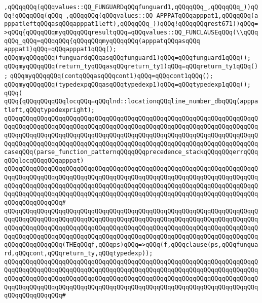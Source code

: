 \verb|,qQQqqQQq(qQQqvalues::QQ_FUNGUARDqQQqfunguard1,qQQqqQQq_,qQQqqQQq_))qQQq!qQQqqQQq(qQQq_,qQQqqQQq(qQQqvalues::QQ_APPPATqQQqapppat1,qQQqqQQq(apppatleftqQQqasqQQqapppat1left),qQQqqQQq_))qQQq!qQQqqQQqrest671))qQQq=>qQQq{qQQqqQQqmyqQQqqQQqresultqQQq=qQQqvalues::QQ_FUNCLAUSEqQQq(\\qQQqqQQq_qQQq=qQQqqQQq{qQQqqQQqmyqQQqqQQq(apppatqQQqasqQQq|\newline
\verb|apppat1)qQQq=qQQqapppat1qQQq();|\newline
\verb|qQQqmyqQQqqQQq(funguardqQQqasqQQqfunguard1)qQQq=qQQqfunguard1qQQq();|\newline
\verb|qQQqmyqQQqqQQq(return_tyqQQqasqQQqreturn_ty1)qQQq=qQQqreturn_ty1qQQq();|\newline
\verb|qQQqmyqQQqqQQq(contqQQqasqQQqcont1)qQQq=qQQqcont1qQQq();|\newline
\verb|qQQqmyqQQqqQQq(typedexpqQQqasqQQqtypedexp1)qQQq=qQQqtypedexp1qQQq();|\newline
\verb|qQQq(|\newline
\verb|qQQq{qQQqqQQqqQQqlocqQQq=qQQqlnd::locationqQQqline_number_dbqQQq(apppatleft,qQQqtypedexpright);|\newline
\newline
\verb|qQQqqQQqqQQqqQQqqQQqqQQqqQQqqQQqqQQqqQQqqQQqqQQqqQQqqQQqqQQqqQQqqQQqqQQqqQQqqQQqqQQqqQQqqQQqqQQqqQQqqQQqqQQqqQQqqQQqqQQqqQQqqQQqqQQqqQQqqQQqqQQqqQQqqQQqqQQqqQQqqQQqqQQqqQQqqQQqqQQqqQQqqQQqqQQqqQQqqQQqqQQqqQQqqQQqqQQqqQQqqQQqqQQqqQQqqQQqqQQqqQQqqQQqqQQqqQQqqQQqqQQqqQQqqQQqqQQqqQQqcaseqQQq(parse_function_patternqQQqqQQqprecedence_stackqQQqqQQqerrqQQqqQQqlocqQQqqQQqapppat)|\newline
\verb|qQQqqQQqqQQqqQQqqQQqqQQqqQQqqQQqqQQqqQQqqQQqqQQqqQQqqQQqqQQqqQQqqQQqqQQqqQQqqQQqqQQqqQQqqQQqqQQqqQQqqQQqqQQqqQQqqQQqqQQqqQQqqQQqqQQqqQQqqQQqqQQqqQQqqQQqqQQqqQQqqQQqqQQqqQQqqQQqqQQqqQQqqQQqqQQqqQQqqQQqqQQqqQQqqQQqqQQqqQQqqQQqqQQqqQQqqQQqqQQqqQQqqQQqqQQqqQQqqQQqqQQqqQQqqQQqqQQqqQQqqQQqqQQqqQQqqQQq#|\newline
\verb|qQQqqQQqqQQqqQQqqQQqqQQqqQQqqQQqqQQqqQQqqQQqqQQqqQQqqQQqqQQqqQQqqQQqqQQqqQQqqQQqqQQqqQQqqQQqqQQqqQQqqQQqqQQqqQQqqQQqqQQqqQQqqQQqqQQqqQQqqQQqqQQqqQQqqQQqqQQqqQQqqQQqqQQqqQQqqQQqqQQqqQQqqQQqqQQqqQQqqQQqqQQqqQQqqQQqqQQqqQQqqQQqqQQqqQQqqQQqqQQqqQQqqQQqqQQqqQQqqQQqqQQqqQQqqQQqqQQqqQQqqQQqqQQqqQQqqQQq(THEqQQqf,qQQqps)qQQq=>qQQq(f,qQQqclause(ps,qQQqfunguard,qQQqcont,qQQqreturn_ty,qQQqtypedexp));|\newline
\verb|qQQqqQQqqQQqqQQqqQQqqQQqqQQqqQQqqQQqqQQqqQQqqQQqqQQqqQQqqQQqqQQqqQQqqQQqqQQqqQQqqQQqqQQqqQQqqQQqqQQqqQQqqQQqqQQqqQQqqQQqqQQqqQQqqQQqqQQqqQQqqQQqqQQqqQQqqQQqqQQqqQQqqQQqqQQqqQQqqQQqqQQqqQQqqQQqqQQqqQQqqQQqqQQqqQQqqQQqqQQqqQQqqQQqqQQqqQQqqQQqqQQqqQQqqQQqqQQqqQQqqQQqqQQqqQQqqQQqqQQqqQQqqQQqqQQqqQQq#|\newline
